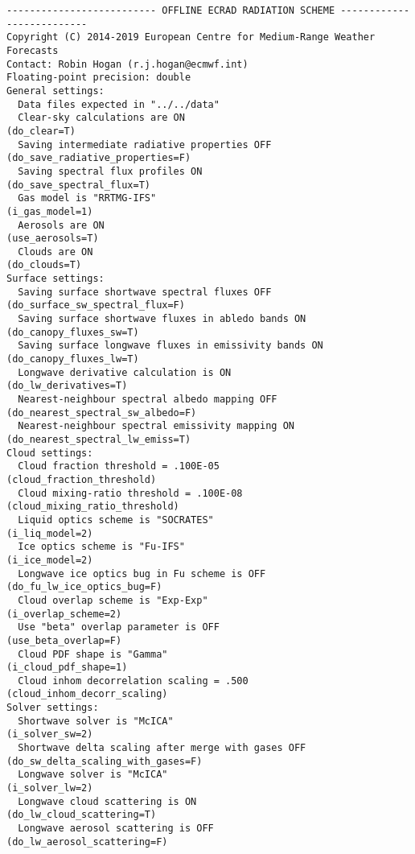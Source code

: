 \documentclass[a4,oneside]{article}
\begin{document}
\footnotesize
\begin{verbatim}
-------------------------- OFFLINE ECRAD RADIATION SCHEME --------------------------
Copyright (C) 2014-2019 European Centre for Medium-Range Weather Forecasts
Contact: Robin Hogan (r.j.hogan@ecmwf.int)
Floating-point precision: double
General settings:
  Data files expected in "../../data"
  Clear-sky calculations are ON                              (do_clear=T)
  Saving intermediate radiative properties OFF               (do_save_radiative_properties=F)
  Saving spectral flux profiles ON                           (do_save_spectral_flux=T)
  Gas model is "RRTMG-IFS"                                   (i_gas_model=1)
  Aerosols are ON                                            (use_aerosols=T)
  Clouds are ON                                              (do_clouds=T)
Surface settings:
  Saving surface shortwave spectral fluxes OFF               (do_surface_sw_spectral_flux=F)
  Saving surface shortwave fluxes in abledo bands ON         (do_canopy_fluxes_sw=T)
  Saving surface longwave fluxes in emissivity bands ON      (do_canopy_fluxes_lw=T)
  Longwave derivative calculation is ON                      (do_lw_derivatives=T)
  Nearest-neighbour spectral albedo mapping OFF              (do_nearest_spectral_sw_albedo=F)
  Nearest-neighbour spectral emissivity mapping ON           (do_nearest_spectral_lw_emiss=T)
Cloud settings:
  Cloud fraction threshold = .100E-05                        (cloud_fraction_threshold)
  Cloud mixing-ratio threshold = .100E-08                    (cloud_mixing_ratio_threshold)
  Liquid optics scheme is "SOCRATES"                         (i_liq_model=2)
  Ice optics scheme is "Fu-IFS"                              (i_ice_model=2)
  Longwave ice optics bug in Fu scheme is OFF                (do_fu_lw_ice_optics_bug=F)
  Cloud overlap scheme is "Exp-Exp"                          (i_overlap_scheme=2)
  Use "beta" overlap parameter is OFF                        (use_beta_overlap=F)
  Cloud PDF shape is "Gamma"                                 (i_cloud_pdf_shape=1)
  Cloud inhom decorrelation scaling = .500                   (cloud_inhom_decorr_scaling)
Solver settings:
  Shortwave solver is "McICA"                                (i_solver_sw=2)
  Shortwave delta scaling after merge with gases OFF         (do_sw_delta_scaling_with_gases=F)
  Longwave solver is "McICA"                                 (i_solver_lw=2)
  Longwave cloud scattering is ON                            (do_lw_cloud_scattering=T)
  Longwave aerosol scattering is OFF                         (do_lw_aerosol_scattering=F)

\end{verbatim}
\end{document}
